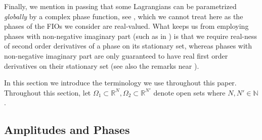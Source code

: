\documentclass[
	fontsize=11pt, 
	twoside=false, 
	abstract=true, 
	a4paper,
]{scrartcl}
\newcommand{\sem}{\setminus\{0\}}
\newcommand{\RR}{\mathbb{R}}
\begin{document}

Finally, we mention in passing that some Lagrangians can be parametrized \emph{globally} by a complex phase function, see \cite{zbMATH00710569,zbMATH07714766}, which we cannot treat here as the phases of the FIOs we consider are real-valued. What keeps us from employing phases with non-negative imaginary part (such as in \cite[Def.~25.4.3]{zbMATH05528184}) is that we require real-ness of second order derivatives of a phase on its stationary set, whereas phases with non-negative imaginary part are only guaranteed to have real first order derivatives on their stationary set (see also the remarks near \cite[Thm.~8.1.9]{hoermander1}).

In this section we introduce the terminology we use throughout this paper. Throughout this section, let $\Omega_1 \subset \RR^N, \Omega_2 \subset \RR^{N'}$ denote open sets where $N,N'\in\mathbb{N}$. %

\subsection{Amplitudes and Phases}
\end{document}

